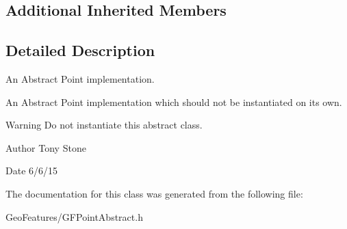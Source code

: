 \subsection*{Additional Inherited Members}


\subsection{Detailed Description}
An Abstract Point implementation. 

An Abstract Point implementation which should not be instantiated on it\textquotesingle{}s own.

\begin{DoxyWarning}{Warning}
Do not instantiate this abstract class.
\end{DoxyWarning}
\begin{DoxyAuthor}{Author}
Tony Stone 
\end{DoxyAuthor}
\begin{DoxyDate}{Date}
6/6/15 
\end{DoxyDate}


The documentation for this class was generated from the following file\+:\begin{DoxyCompactItemize}
\item 
Geo\+Features/G\+F\+Point\+Abstract.\+h\end{DoxyCompactItemize}
